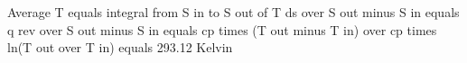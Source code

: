 Average T equals integral from S in to S out of T ds over S out minus S in equals q rev over S out minus S in equals cp times (T out minus T in) over cp times ln(T out over T in) equals 293.12 Kelvin